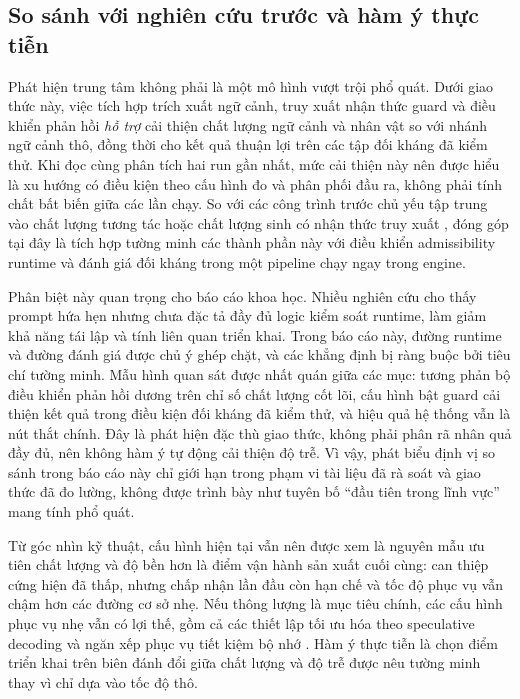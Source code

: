 ﻿\documentclass[a4paper,12pt]{article}
\begin{document}
\subsection{So sánh với nghiên cứu trước và hàm ý thực tiễn}
Phát hiện trung tâm không phải là một mô hình vượt trội phổ quát. Dưới giao thức này, việc tích hợp trích xuất ngữ cảnh, truy xuất nhận thức guard và điều khiển phản hồi \emph{hỗ trợ} cải thiện chất lượng ngữ cảnh và nhân vật so với nhánh ngữ cảnh thô, đồng thời cho kết quả thuận lợi trên các tập đối kháng đã kiểm thử. Khi đọc cùng phân tích hai run gần nhất, mức cải thiện này nên được hiểu là xu hướng có điều kiện theo cấu hình đo và phân phối đầu ra, không phải tính chất bất biến giữa các lần chạy. So với các công trình trước chủ yếu tập trung vào chất lượng tương tác \cite{Park2023GenerativeAgents} hoặc chất lượng sinh có nhận thức truy xuất \cite{Asai2024SelfRAG,Edge2024GraphRAG}, đóng góp tại đây là tích hợp tường minh các thành phần này với điều khiển admissibility runtime và đánh giá đối kháng trong một pipeline chạy ngay trong engine.

Phân biệt này quan trọng cho báo cáo khoa học. Nhiều nghiên cứu cho thấy prompt hứa hẹn nhưng chưa đặc tả đầy đủ logic kiểm soát runtime, làm giảm khả năng tái lập và tính liên quan triển khai. Trong báo cáo này, đường runtime và đường đánh giá được chủ ý ghép chặt, và các khẳng định bị ràng buộc bởi tiêu chí tường minh. Mẫu hình quan sát được nhất quán giữa các mục: tương phản bộ điều khiển phản hồi dương trên chỉ số chất lượng cốt lõi, cấu hình bật guard cải thiện kết quả trong điều kiện đối kháng đã kiểm thử, và hiệu quả hệ thống vẫn là nút thắt chính. Đây là phát hiện đặc thù giao thức, không phải phân rã nhân quả đầy đủ, nên không hàm ý tự động cải thiện độ trễ.
Vì vậy, phát biểu định vị so sánh trong báo cáo này chỉ giới hạn trong phạm vi tài liệu đã rà soát và giao thức đã đo lường, không được trình bày như tuyên bố ``đầu tiên trong lĩnh vực'' mang tính phổ quát.

Từ góc nhìn kỹ thuật, cấu hình hiện tại vẫn nên được xem là nguyên mẫu ưu tiên chất lượng và độ bền hơn là điểm vận hành sản xuất cuối cùng: can thiệp cứng hiện đã thấp, nhưng chấp nhận lần đầu còn hạn chế và tốc độ phục vụ vẫn chậm hơn các đường cơ sở nhẹ. Nếu thông lượng là mục tiêu chính, các cấu hình phục vụ nhẹ vẫn có lợi thế, gồm cả các thiết lập tối ưu hóa theo speculative decoding và ngăn xếp phục vụ tiết kiệm bộ nhớ \cite{Leviathan2022SpecDec,Kwon2023vLLM}. Hàm ý thực tiễn là chọn điểm triển khai trên biên đánh đổi giữa chất lượng và độ trễ được nêu tường minh thay vì chỉ dựa vào tốc độ thô.
\end{document}
